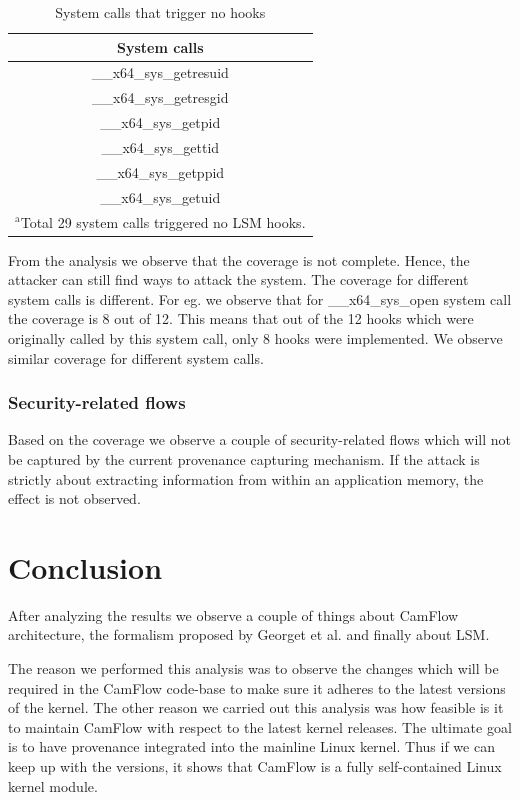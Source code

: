 \documentclass{IEEEtran}
\begin{document}
\begin{table}[htbp]
	\caption{System calls that trigger no hooks}
	\begin{center}
		\begin{tabular}{|c|}
			\hline
			\textbf{System calls} \\
			\hline \_\_x64\_sys\_getresuid
			 \\
			\hline \_\_x64\_sys\_getresgid \\
				\hline \_\_x64\_sys\_getpid \\
					\hline \_\_x64\_sys\_gettid \\
						\hline \_\_x64\_sys\_getppid \\
							\hline \_\_x64\_sys\_getuid \\
	
			
			\hline
			\multicolumn{4}{l}{$^{\mathrm{a}}$Total 29 system calls triggered no LSM hooks.}
		\end{tabular}
		\label{tab1}
	\end{center}
\end{table}

From the analysis we observe that the coverage is not complete. Hence, the attacker can still find ways to attack the system. The coverage for different system calls is different. For eg. we observe that for \_\_x64\_sys\_open system call the coverage is 8 out of 12. This means that out of the 12 hooks which were originally called by this system call, only 8 hooks were implemented. We observe similar coverage for different system calls. 

\subsubsection{Security-related flows}

Based on the coverage we observe a couple of security-related flows which will not be captured by the current provenance capturing mechanism.  If the attack is strictly about extracting information from within an application memory, the effect is not observed. 
\section{Conclusion}

After analyzing the results we observe a couple of things about CamFlow architecture, the formalism proposed by Georget et al. and finally about LSM. 

The reason we performed this analysis was to observe the changes which will be required in the CamFlow code-base to make sure it adheres to the latest versions of the kernel. The other reason we carried out this analysis was how feasible is it to maintain CamFlow with respect to the latest kernel releases. The ultimate goal is to have provenance integrated into the mainline Linux kernel. Thus if we can keep up with the versions, it shows that CamFlow is a fully self-contained Linux kernel module. 
\end{document}
